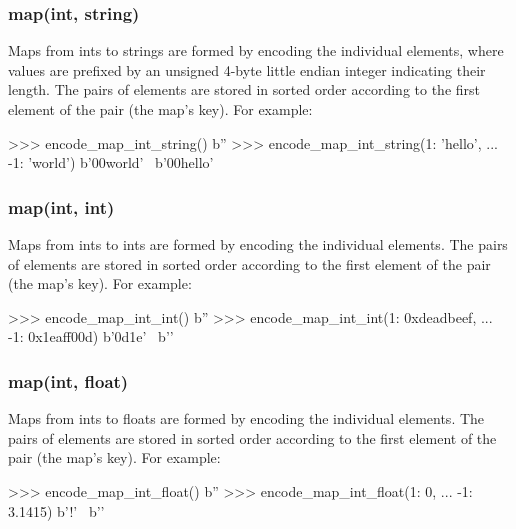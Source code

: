 \subsubsection{map(int, string)}

Maps from ints to strings are formed by encoding the individual elements, where
values are prefixed by an unsigned 4-byte little endian integer indicating their
length.  The pairs of elements are stored in sorted order according to the first
element of the pair (the map's key).  For example:

\begin{pythoncode}
>>> encode_map_int_string({})
b''
>>> encode_map_int_string({1: 'hello',
...                        -1: 'world'})
b'\xff\xff\xff\xff\xff\xff\xff\xff{}\x00world' \
b'\x00hello'
\end{pythoncode}

\subsubsection{map(int, int)}

Maps from ints to ints are formed by encoding the individual elements.  The
pairs of elements are stored in sorted order according to the first element of
the pair (the map's key).  For example:

\begin{pythoncode}
>>> encode_map_int_int({})
b''
>>> encode_map_int_int({1: 0xdeadbeef,
...                     -1: 0x1eaff00d})
b'\xff\xff\xff\xff\xff\xff\xff\xff\x0d\xaf\x1e' \
b'\xef\xbe\xad\xde{}'
\end{pythoncode}

\subsubsection{map(int, float)}

Maps from ints to floats are formed by encoding the individual elements.  The
pairs of elements are stored in sorted order according to the first element of
the pair (the map's key).  For example:

\begin{pythoncode}
>>> encode_map_int_float({})
b''
>>> encode_map_int_float({1: 0,
...                       -1: 3.1415})
b'\xff\xff\xff\xff\xff\xff\xff\xffo{}\xca!\t@' \
b''
\end{pythoncode}

